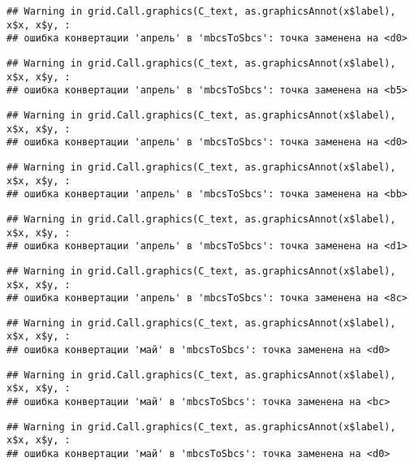 \documentclass[
]{article}
\begin{document}
\begin{verbatim}
## Warning in grid.Call.graphics(C_text, as.graphicsAnnot(x$label), x$x, x$y, :
## ошибка конвертации 'апрель' в 'mbcsToSbcs': точка заменена на <d0>
\end{verbatim}

\begin{verbatim}
## Warning in grid.Call.graphics(C_text, as.graphicsAnnot(x$label), x$x, x$y, :
## ошибка конвертации 'апрель' в 'mbcsToSbcs': точка заменена на <b5>
\end{verbatim}

\begin{verbatim}
## Warning in grid.Call.graphics(C_text, as.graphicsAnnot(x$label), x$x, x$y, :
## ошибка конвертации 'апрель' в 'mbcsToSbcs': точка заменена на <d0>
\end{verbatim}

\begin{verbatim}
## Warning in grid.Call.graphics(C_text, as.graphicsAnnot(x$label), x$x, x$y, :
## ошибка конвертации 'апрель' в 'mbcsToSbcs': точка заменена на <bb>
\end{verbatim}

\begin{verbatim}
## Warning in grid.Call.graphics(C_text, as.graphicsAnnot(x$label), x$x, x$y, :
## ошибка конвертации 'апрель' в 'mbcsToSbcs': точка заменена на <d1>
\end{verbatim}

\begin{verbatim}
## Warning in grid.Call.graphics(C_text, as.graphicsAnnot(x$label), x$x, x$y, :
## ошибка конвертации 'апрель' в 'mbcsToSbcs': точка заменена на <8c>
\end{verbatim}

\begin{verbatim}
## Warning in grid.Call.graphics(C_text, as.graphicsAnnot(x$label), x$x, x$y, :
## ошибка конвертации 'май' в 'mbcsToSbcs': точка заменена на <d0>
\end{verbatim}

\begin{verbatim}
## Warning in grid.Call.graphics(C_text, as.graphicsAnnot(x$label), x$x, x$y, :
## ошибка конвертации 'май' в 'mbcsToSbcs': точка заменена на <bc>
\end{verbatim}

\begin{verbatim}
## Warning in grid.Call.graphics(C_text, as.graphicsAnnot(x$label), x$x, x$y, :
## ошибка конвертации 'май' в 'mbcsToSbcs': точка заменена на <d0>
\end{verbatim}
\end{document}
